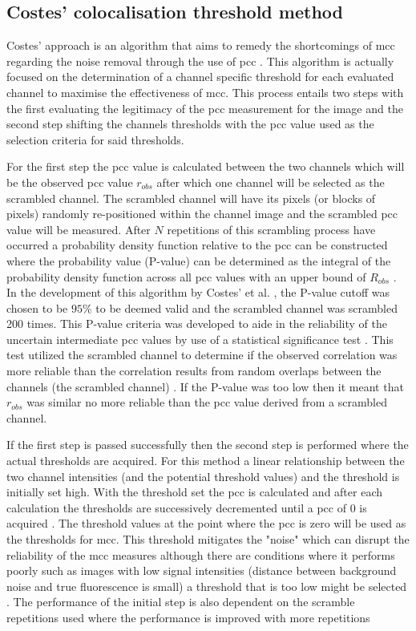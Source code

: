 \subsection{Costes' colocalisation threshold method}
Costes' approach is an algorithm that aims to remedy the shortcomings of \gls{mcc} regarding the noise removal through the use of \gls{pcc} \cite{costes}. This algorithm is actually focused on the determination of a channel specific threshold for each evaluated channel to maximise the effectiveness of \gls{mcc}. This process entails two steps with the first evaluating the legitimacy of the \gls{pcc} measurement for the image and the second step shifting the channels thresholds with the \gls{pcc} value used as the selection criteria for said thresholds.\par For the first step the \gls{pcc} value is calculated between the two channels which will be the observed \gls{pcc} value $r_{obs}$ after which one channel will be selected as the scrambled channel. The scrambled channel will have its pixels (or blocks of pixels) randomly re-positioned within the channel image and the scrambled \gls{pcc} value will be measured. After $N$ repetitions of this scrambling process have occurred a probability density function relative to the \gls{pcc} can be constructed where the probability value (P-value) can be determined as the integral of the probability density function across all \gls{pcc} values with an upper bound of $R_{obs}$ \cite{Bolte-2006}. In the development of this algorithm by Costes' et al. \cite{costes}, the P-value cutoff was chosen to be $95\%$ to be deemed valid and the scrambled channel was scrambled 200 times. This P-value criteria was developed to aide in the reliability of the uncertain intermediate \gls{pcc} values by use of a statistical significance test \cite{costes}. This test utilized the scrambled channel to determine if the observed correlation was more reliable than the correlation results from random overlaps between the channels (the scrambled channel) \cite{costes}. If the P-value was too low then it meant that $r_{obs}$ was similar no more reliable than the \gls{pcc} value derived from a scrambled channel.\par If the first step is passed successfully then the second step is performed where the actual thresholds are acquired. For this method a linear relationship between the two channel intensities (and the potential threshold values) and the threshold is initially set high. With the threshold set the \gls{pcc} is calculated and after each calculation the thresholds are successively decremented until a \gls{pcc} of 0 is acquired \cite{practical_guide_coloc, costes}. The threshold values at the point where the \gls{pcc} is zero will be used as the thresholds for \gls{mcc}. This threshold mitigates the "noise" which can disrupt the reliability of the \gls{mcc} measures although there are conditions where it performs poorly such as images with low signal intensities (distance between background noise and true fluorescence is small) a threshold that is too low might be selected \cite{practical_guide_coloc}. The performance of the initial step is also dependent on the scramble repetitions used where the performance is improved with more repetitions 